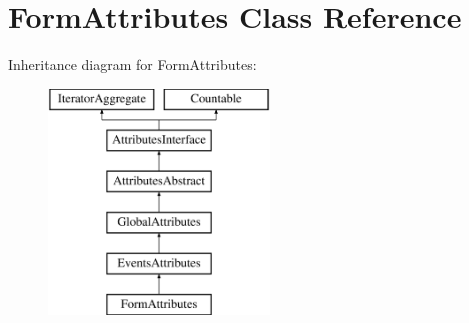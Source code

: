 \hypertarget{class_pes_1_1_dom_1_1_node_1_1_attributes_1_1_form_attributes}{}\section{Form\+Attributes Class Reference}
\label{class_pes_1_1_dom_1_1_node_1_1_attributes_1_1_form_attributes}
Inheritance diagram for Form\+Attributes\+:\begin{figure}[H]
\begin{center}
\leavevmode
\includegraphics[height=6.000000cm]{class_pes_1_1_dom_1_1_node_1_1_attributes_1_1_form_attributes}
\end{center}
\end{figure}
